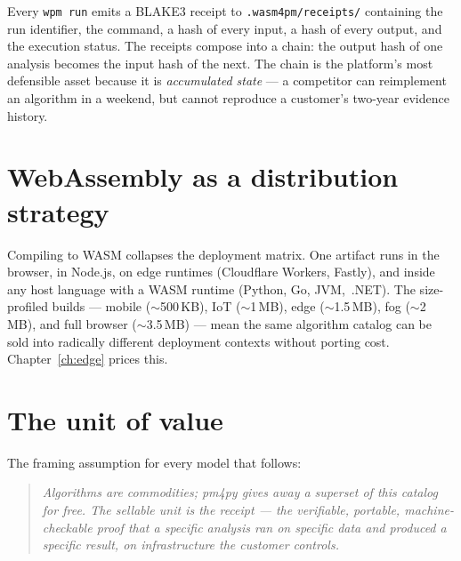 Every \texttt{wpm run} emits a BLAKE3 receipt to
\texttt{.wasm4pm/receipts/} containing the run identifier, the command, a
hash of every input, a hash of every output, and the execution status. The
receipts compose into a chain: the output hash of one analysis becomes the
input hash of the next. The chain is the platform's most defensible asset
because it is \emph{accumulated state} --- a competitor can reimplement an
algorithm in a weekend, but cannot reproduce a customer's two-year evidence
history.

\section{WebAssembly as a distribution strategy}

Compiling to WASM collapses the deployment matrix. One artifact runs in the
browser, in Node.js, on edge runtimes (Cloudflare Workers, Fastly), and
inside any host language with a WASM runtime (Python, Go, JVM,~.NET). The
size-profiled builds --- mobile ($\sim$500\,KB), IoT ($\sim$1\,MB), edge
($\sim$1.5\,MB), fog ($\sim$2\,MB), and full browser ($\sim$3.5\,MB) ---
mean the same algorithm catalog can be sold into radically different
deployment contexts without porting cost. Chapter~\ref{ch:edge} prices this.

\section{The unit of value}

The framing assumption for every model that follows:

\begin{quote}
\itshape Algorithms are commodities; pm4py gives away a superset of this
catalog for free. The sellable unit is the receipt --- the verifiable,
portable, machine-checkable proof that a specific analysis ran on specific
data and produced a specific result, on infrastructure the customer
controls.
\end{quote}
